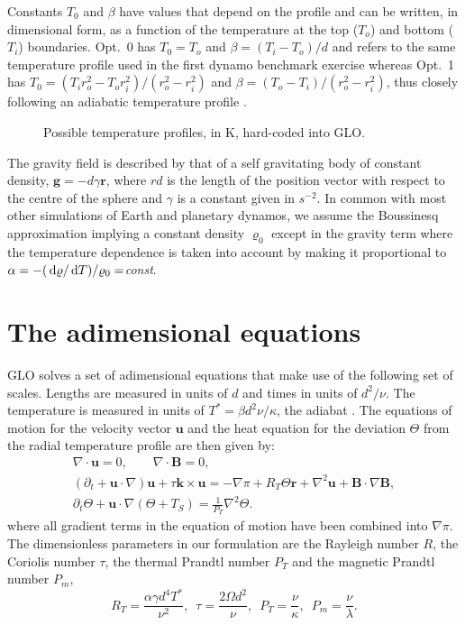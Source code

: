 \documentclass[a4paper,10pt]{book}
\newcommand{\de}{{\rm \, d}}
\renewcommand{\vec}[1]{\mathbf{#1}}
\begin{document}
Constants $T_0$ and $\beta$ have values that depend on the profile and can be
written, in dimensional form, as a function of the temperature at the top
($T_o$) and bottom ($T_i$) boundaries. Opt.~0 has $T_0 = T_o$ and $\beta = (T_i
-T_o)/d$ and refers to the same temperature profile used in the first dynamo
benchmark exercise \citep{ChristensenEtAl01} whereas Opt.~1 has $T_0 = (T_i
r_o^2 - T_o r_i^2)/(r_o^2 - r_i^2)$ and $\beta = (T_o - T_i)/(r_o^2 - r_i^2)$,
thus closely following an adiabatic temperature profile
\citep{LabrossePoirier1997, DaviesGubbins2011}.

\begin{figure}[htb]
\centering
 
 \caption{Possible temperature profiles, in K, hard-coded into GLO.}
\end{figure}

The gravity field is described by that of a self gravitating body of constant
density, $\vec g = - d \gamma \vec r$, where $rd$ is the length of the position
vector with respect to the centre of the sphere and $\gamma$ is a constant given
in $s^{-2}$. In common with most other simulations of Earth and planetary
dynamos, we assume the Boussinesq approximation implying a constant density
$\varrho_0$ except in the gravity term where the temperature dependence is taken
into account by making it proportional to $\alpha = - ( \de\varrho/\de
T)/\varrho_0 =${\sl const}.

\section{The adimensional equations}
GLO solves a set of adimensional equations that make use of the following set of
scales. Lengths are measured in units of $d$ and times in units of $d^2 / \nu$.
The temperature is measured in units of $T^* = \beta d^2 \nu/\kappa$, the 
adiabat \citep{ArdesEtAl97}. The equations of
motion for the velocity vector $\vec u$ and the heat equation for the deviation
$\Theta$ from the radial temperature profile are then given by:
\begin{subequations}
\begin{gather}
\label{e:nonDivergence}
\nabla \cdot \vec u = 0, \qquad \nabla \cdot \vec B = 0, \\
\label{e:NavierStokes}
(\partial_t + \vec u \cdot \nabla )\vec u + \tau \vec k \times
\vec u = - \nabla \pi + R_T \Theta \vec{r} + \nabla^2 \vec u + \vec B \cdot
\nabla \vec B, \\
\label{e:temperature}
\partial_t \Theta + \vec u \cdot \nabla (\Theta+T_S) = \frac{1}{P_T} \nabla^2 \Theta.
\end{gather}
\end{subequations}
where all gradient terms in the equation of motion have been combined into
$\nabla \pi$. The dimensionless parameters in our formulation are the Rayleigh
number $R$, the Coriolis number $\tau$, the thermal Prandtl number $P_T$ and the
magnetic Prandtl number $P_m$,
\begin{equation}
R_T = \frac{\alpha \gamma d^4 T^*}{\nu^2} ,
\enspace \tau = \frac{2
\Omega d^2}{\nu} , \enspace P_T = \frac{\nu}{\kappa} , \enspace P_m =
\frac{\nu}{\lambda}.
\end{equation}
\end{document}
